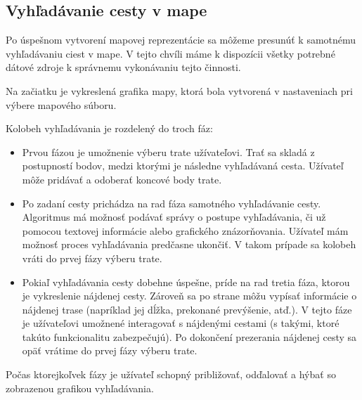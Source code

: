 \subsection{Vyhľadávanie cesty v mape}

Po úspešnom vytvorení mapovej reprezentácie sa môžeme presunúť k samotnému vyhľadávaniu ciest v mape. V tejto chvíli máme k dispozícii všetky potrebné dátové zdroje k správnemu vykonávaniu tejto činnosti.

Na začiatku je vykreslená grafika mapy, ktorá bola vytvorená v nastaveniach pri výbere mapového súboru.

Kolobeh vyhľadávania je rozdelený do troch fáz:
\begin{itemize}
    \item Prvou fázou je umožnenie výberu trate užívateľovi. Trať sa skladá z postupností bodov, medzi ktorými je následne vyhľadávaná cesta. Užívateľ môže pridávať a odoberať koncové body trate.
    \item Po zadaní cesty prichádza na rad fáza samotného vyhľadávanie cesty. Algoritmus má možnosť podávať správy o postupe vyhľadávania, či už pomocou textovej informácie alebo grafického znázorňovania. Užívateľ mám možnosť proces vyhľadávania predčasne ukončiť. V takom prípade sa kolobeh vráti do prvej fázy výberu trate.
    \item Pokiaľ vyhľadávania cesty dobehne úspešne, príde na rad tretia fáza, ktorou je vykreslenie nájdenej cesty. Zároveň sa po strane môžu vypísať informácie o nájdenej trase (napríklad jej dĺžka, prekonané prevýšenie, atď.). V tejto fáze je užívateľovi umožnené interagovať s nájdenými cestami (s takými, ktoré takúto funkcionalitu zabezpečujú). Po dokončení prezerania nájdenej cesty sa opäť vrátime do prvej fázy výberu trate.  
\end{itemize}

Počas ktorejkoľvek fázy je užívateľ schopný približovať, odďalovať a hýbať so zobrazenou grafikou vyhľadávania.

